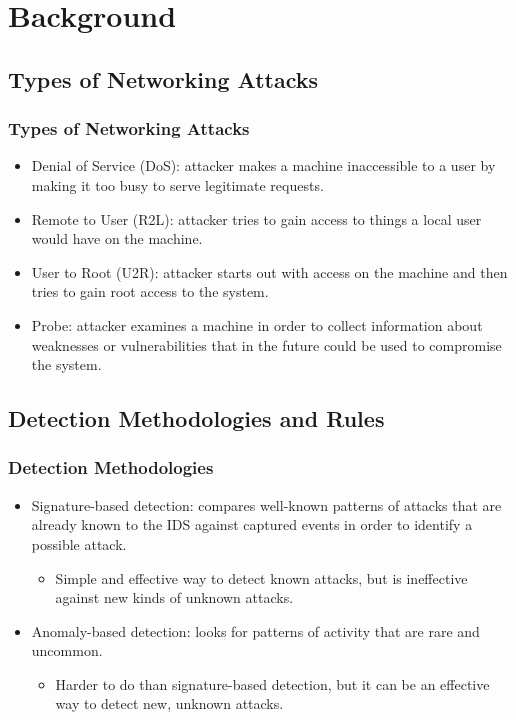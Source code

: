 \documentclass{beamer}
\newcommand{\linespace}{\vskip 0.25cm}
\begin{document}
\section[Background]{Background}
\subsection{Types of Networking Attacks}
\begin{frame}
  \frametitle{Types of Networking Attacks}
  \begin{itemize}
  	\item Denial of Service (DoS): attacker makes a machine inaccessible to a user by making it too busy to serve legitimate requests.

  	\linespace
  	\linespace

  	\item Remote to User (R2L): attacker tries to gain access to things a local user would have on the machine.

  	\linespace
  	\linespace
  	
  	\item User to Root (U2R): attacker starts out with access on the machine and then tries to gain root access to the system.

  	\linespace
  	\linespace
  	
  	\item Probe: attacker examines a machine in order to collect information about weaknesses or vulnerabilities that in the future could be used to compromise the system.
  \end{itemize}
\end{frame}


\subsection{Detection Methodologies and Rules}
\begin{frame}
  \frametitle{Detection Methodologies}
  \begin{itemize}
  	\item Signature-based detection: compares well-known patterns of attacks
that are already known to the IDS against captured events in order to identify a possible attack.
	\begin{itemize}
		\item Simple and effective way to detect known attacks, but is ineffective against new kinds of unknown attacks.
	\end{itemize}

\linespace
\linespace

  	\item Anomaly-based detection: looks for patterns of activity that are rare and uncommon.
	\begin{itemize}
		\item Harder to do than signature-based detection, but it can be an effective way to detect new, unknown attacks.
	\end{itemize}
  \end{itemize}
\end{frame}
\end{document}
